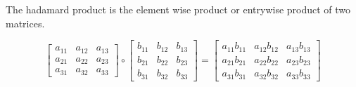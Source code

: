 \documentclass{article}
\begin{document}
The hadamard product is the element wise product or entrywise product of two matrices.

\begin{equation}
    \begin{bmatrix}
    a_{11} & a_{12} & a_{13} \\
    a_{21} & a_{22} & a_{23} \\
    a_{31} & a_{32} & a_{33}
    \end{bmatrix} \circ
    \begin{bmatrix}
    b_{11} & b_{12} & b_{13} \\
    b_{21} & b_{22} & b_{23} \\
    b_{31} & b_{32} & b_{33}
    \end{bmatrix} = 
    \begin{bmatrix}
    a_{11}b_{11} & a_{12}b_{12} & a_{13}b_{13} \\
    a_{21}b_{21} & a_{22}b_{22} & a_{23}b_{23} \\
    a_{31}b_{31} & a_{32}b_{32} & a_{33}b_{33}
    \end{bmatrix}
\end{equation}
\end{document}

